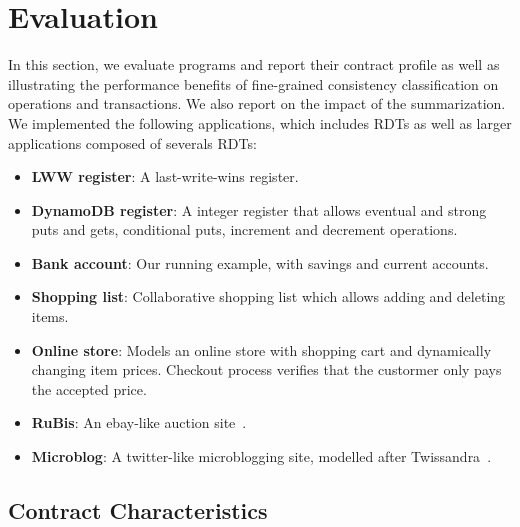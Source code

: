 \section{Evaluation}

In this section, we evaluate \name programs and report their contract profile
as well as illustrating the performance benefits of fine-grained consistency
classification on operations and transactions. We also report on the impact of
the summarization. We implemented the following applications, which includes
RDTs as well as larger applications composed of severals RDTs:

\begin{itemize} \item \textbf{LWW register}: A last-write-wins register. \item
\textbf{DynamoDB register}: A integer register that allows eventual and strong
puts and gets, conditional puts, increment and decrement operations. \item
\textbf{Bank account}: Our running example, with savings and current accounts.
\item \textbf{Shopping list}: Collaborative shopping list which allows adding
and deleting items. \item \textbf{Online store}: Models an online store with
shopping cart and dynamically changing item prices. Checkout process verifies
that the custormer only pays the accepted price. \item \textbf{RuBis}: An
ebay-like auction site~\cite{}. \item \textbf{Microblog}: A twitter-like
microblogging site, modelled after Twissandra~\cite{}. \end{itemize}

\subsection{Contract Characteristics}

